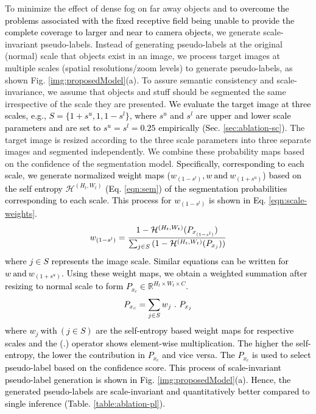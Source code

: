 \documentclass[final,5p,times,twocolumn]{elsarticle}
\begin{document}
To minimize the effect of dense fog on far away objects and \textcolor{black}{to overcome the problems associated with the fixed receptive field being unable to provide the complete coverage to larger and near to camera objects,} we generate scale-invariant pseudo-labels.
Instead of generating pseudo-labels at the original (normal) scale that objects exist in an image, we  process target images at multiple scales (spatial resolutions/zoom levels) to generate pseudo-labels, as shown Fig. \ref{img:proposedModel}(a). To assure semantic consistency and scale-invariance, we assume that objects and stuff should be segmented the same irrespective of the scale they are presented.
\textcolor{black}{We evaluate the target image at three scales, e.g., $S = \{1+s^u, 1, 1-s^l\}$, where $s^u$ and $s^l$ are upper and lower scale parameters and are set to $s^u=s^l=0.25$ empirically (Sec. \ref{sec:ablation-sc})}. The target image is resized according to the three scale parameters into three separate images and segmented independently. 
We combine these probability maps based on the confidence of the segmentation model. \textcolor{black}{Specifically, corresponding to each scale, we generate normalized weight maps ($w_{(1-s^l)}, w ~\text{and} ~w_{(1+s^u)}$) based on the self entropy $\mathcal{H}^{(H_t,W_t)}$ (Eq. \ref{eqn:sem}) of the segmentation probabilities corresponding to each scale. This process for $w_{(1-s^l)}$ is shown in Eq. \ref{eqn:scale-weights}.
\begin{equation}
\small
   w_{(1-s^l)} = \frac{1- \mathcal{H}^{(H_t,W_t)} (P_{x_{(1-s^l)}})}
   {\sum_{j\in S} {(1- \mathcal{H}^{(H_t,W_t)} (P_{x_{j}}))}}
\label{eqn:scale-weights}
\end{equation}
where $j\in S$ represents the image scale.
Similar equations can be written for $w ~\text{and} ~w_{(1+s^u)}$. Using these weight maps, we obtain a weighted summation after resizing to normal scale to form $P_{x_c} \in \mathbb{R} ^{H_t\times W_t\times C}$.
\begin{equation}
\small
P_{x_c} = \sum_{j\in S}{w_j~.~P_{x_j}}
\label{eqn:3-sc}
\end{equation}
where $w_j~\text{with}~(j\in S)$ are the self-entropy based weight maps for respective scales and the (.) operator shows element-wise multiplication.
The higher the self-entropy, the lower the contribution in  $P_{x_c}$ and vice versa. 
The $P_{x_c}$ is used to select pseudo-label based on the confidence score. This process of scale-invariant pseudo-label generation is shown in Fig. \ref{img:proposedModel}(a). 
Hence, the generated pseudo-labels are scale-invariant and quantitatively better compared to single inference (Table. \ref{table:ablation-pl}).
}
\end{document}
